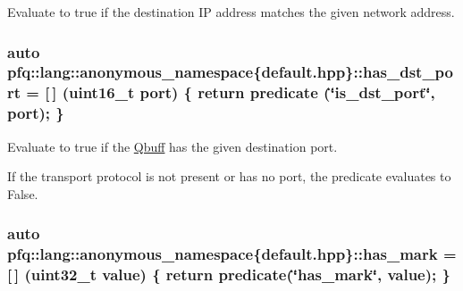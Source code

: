 Evaluate to {\ttfamily true} if the destination IP address matches the given network address. 

\subsubsection[{\texorpdfstring{has\+\_\+dst\+\_\+port}{has_dst_port}}]{\setlength{\rightskip}{0pt plus 5cm}auto pfq\+::lang\+::anonymous\+\_\+namespace\{default.\+hpp\}\+::has\+\_\+dst\+\_\+port = \mbox{[}$\,$\mbox{]} (uint16\+\_\+t {\bf port}) \{ return {\bf predicate} (\char`\"{}is\+\_\+dst\+\_\+port\char`\"{}, port); \}}\hypertarget{namespacepfq_1_1lang_1_1anonymous__namespace_02default_8hpp_03_afa71ece0f4178d0200c0388f503eef14}{}\label{namespacepfq_1_1lang_1_1anonymous__namespace_02default_8hpp_03_afa71ece0f4178d0200c0388f503eef14}


Evaluate to {\ttfamily true} if the \hyperlink{structpfq_1_1lang_1_1Qbuff}{Qbuff} has the given destination port. 

If the transport protocol is not present or has no port, the predicate evaluates to False. 
\subsubsection[{\texorpdfstring{has\+\_\+mark}{has_mark}}]{\setlength{\rightskip}{0pt plus 5cm}auto pfq\+::lang\+::anonymous\+\_\+namespace\{default.\+hpp\}\+::has\+\_\+mark = \mbox{[}$\,$\mbox{]} (uint32\+\_\+t value) \{ return {\bf predicate}(\char`\"{}has\+\_\+mark\char`\"{}, value); \}}\hypertarget{namespacepfq_1_1lang_1_1anonymous__namespace_02default_8hpp_03_aa4ce1fdb0d99e1ca0afdf76619c58d12}{}\label{namespacepfq_1_1lang_1_1anonymous__namespace_02default_8hpp_03_aa4ce1fdb0d99e1ca0afdf76619c58d12}



